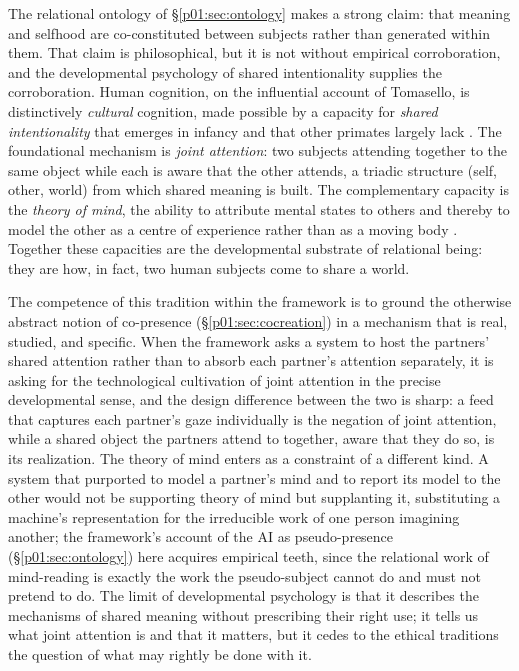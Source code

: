 \documentclass[11pt,a4paper]{article}
\begin{document}
The relational ontology of §\ref{p01:sec:ontology} makes a strong claim: that meaning and selfhood are co-constituted between subjects rather than generated within them. That claim is philosophical, but it is not without empirical corroboration, and the developmental psychology of shared intentionality supplies the corroboration. Human cognition, on the influential account of Tomasello, is distinctively \emph{cultural} cognition, made possible by a capacity for \emph{shared intentionality} that emerges in infancy and that other primates largely lack \parencite{tomasello1999cultural, tomasello2005intentions}. The foundational mechanism is \emph{joint attention}: two subjects attending together to the same object while each is aware that the other attends, a triadic structure (self, other, world) from which shared meaning is built. The complementary capacity is the \emph{theory of mind}, the ability to attribute mental states to others and thereby to model the other as a centre of experience rather than as a moving body \parencite{premack1978does}. Together these capacities are the developmental substrate of relational being: they are how, in fact, two human subjects come to share a world.

The competence of this tradition within the framework is to ground the otherwise abstract notion of co-presence (§\ref{p01:sec:cocreation}) in a mechanism that is real, studied, and specific. When the framework asks a system to host the partners' shared attention rather than to absorb each partner's attention separately, it is asking for the technological cultivation of joint attention in the precise developmental sense, and the design difference between the two is sharp: a feed that captures each partner's gaze individually is the negation of joint attention, while a shared object the partners attend to together, aware that they do so, is its realization. The theory of mind enters as a constraint of a different kind. A system that purported to model a partner's mind and to report its model to the other would not be supporting theory of mind but supplanting it, substituting a machine's representation for the irreducible work of one person imagining another; the framework's account of the AI as pseudo-presence (§\ref{p01:sec:ontology}) here acquires empirical teeth, since the relational work of mind-reading is exactly the work the pseudo-subject cannot do and must not pretend to do. The limit of developmental psychology is that it describes the mechanisms of shared meaning without prescribing their right use; it tells us what joint attention is and that it matters, but it cedes to the ethical traditions the question of what may rightly be done with it.
\end{document}
